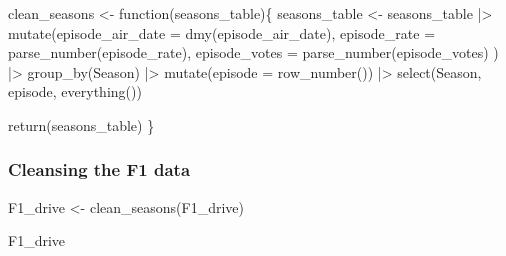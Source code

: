 \documentclass[
  letterpaper,
  DIV=11,
  numbers=noendperiod]{scrartcl}
\newenvironment{Shaded}{\begin{snugshade}}{\end{snugshade}}
\newcommand{\AttributeTok}[1]{\textcolor[rgb]{0.40,0.45,0.13}{#1}}
\newcommand{\ControlFlowTok}[1]{\textcolor[rgb]{0.00,0.23,0.31}{#1}}
\newcommand{\FunctionTok}[1]{\textcolor[rgb]{0.28,0.35,0.67}{#1}}
\newcommand{\NormalTok}[1]{\textcolor[rgb]{0.00,0.23,0.31}{#1}}
\newcommand{\OtherTok}[1]{\textcolor[rgb]{0.00,0.23,0.31}{#1}}
\newcommand{\SpecialCharTok}[1]{\textcolor[rgb]{0.37,0.37,0.37}{#1}}
\begin{document}
\begin{Shaded}
\begin{Highlighting}[]
\NormalTok{clean\_seasons }\OtherTok{\textless{}{-}} \ControlFlowTok{function}\NormalTok{(seasons\_table)\{}
\NormalTok{  seasons\_table }\OtherTok{\textless{}{-}}\NormalTok{ seasons\_table }\SpecialCharTok{|\textgreater{}} 
    \FunctionTok{mutate}\NormalTok{(}\AttributeTok{episode\_air\_date =} \FunctionTok{dmy}\NormalTok{(episode\_air\_date),}
           \AttributeTok{episode\_rate =} \FunctionTok{parse\_number}\NormalTok{(episode\_rate),}
           \AttributeTok{episode\_votes =} \FunctionTok{parse\_number}\NormalTok{(episode\_votes)}
\NormalTok{           ) }\SpecialCharTok{|\textgreater{}} 
    \FunctionTok{group\_by}\NormalTok{(Season) }\SpecialCharTok{|\textgreater{}} 
    \FunctionTok{mutate}\NormalTok{(}\AttributeTok{episode =} \FunctionTok{row\_number}\NormalTok{()) }\SpecialCharTok{|\textgreater{}} 
    \FunctionTok{select}\NormalTok{(Season, episode, }\FunctionTok{everything}\NormalTok{())}
  
  \FunctionTok{return}\NormalTok{(seasons\_table)}
\NormalTok{\}}
\end{Highlighting}
\end{Shaded}

\hypertarget{cleansing-the-f1-data}{%
\subsubsection{Cleansing the F1 data}\label{cleansing-the-f1-data}}

\begin{Shaded}
\begin{Highlighting}[]
\NormalTok{F1\_drive }\OtherTok{\textless{}{-}} \FunctionTok{clean\_seasons}\NormalTok{(F1\_drive)}

\NormalTok{F1\_drive}
\end{Highlighting}
\end{Shaded}
\end{document}
